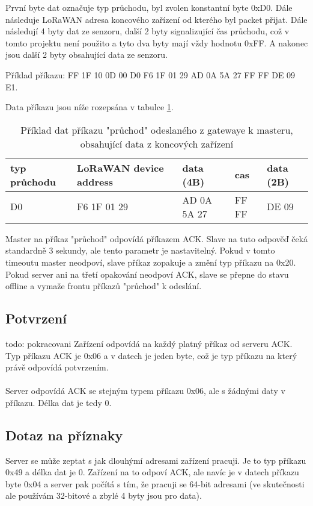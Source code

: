 První byte dat označuje typ průchodu, byl zvolen konstantní byte 0xD0. Dále následuje LoRaWAN adresa koncového zařízení od kterého byl packet přijat. Dále následují 4 byty dat ze senzoru, další 2 byty signalizující čas průchodu, což v tomto projektu není použito a tyto dva byty mají vždy hodnotu 0xFF. A nakonec jsou další 2 byty obsahující data ze senzoru.

Příklad příkazu: FF 1F 10 0D 00 D0 F6 1F 01 29 AD 0A 5A 27 FF FF DE 09 E1.

Data příkazu jsou níže rozepsána v tabulce \ref{table:prikladprikazpruchod}.

\begin{table}[!h]
    \centering
\begin{tabular}{ | p{1.5cm} | p{3cm} | p{2.5cm} | p{1.3cm} | p{1.3cm} |  }
 \hline
 typ průchodu & LoRaWAN device address & data (4B)     & cas   & data (2B) \\ \hline
 D0           & F6 1F 01 29            &  AD 0A 5A 27  & FF FF & DE 09     \\ 
 \hline
\end{tabular}
    \caption{Příklad dat příkazu "průchod" odeslaného z gatewaye k masteru, obsahující data z koncových zařízení}
    \label{table:prikladprikazpruchod}
\end{table}

Master na příkaz "průchod" odpovídá příkazem ACK. Slave na tuto odpověď čeká standardně 3 sekundy, ale tento parametr je nastavitelný. Pokud v tomto timeoutu master neodpoví, slave  příkaz zopakuje a změní typ příkazu na 0x20. Pokud server ani na třetí opakování neodpoví ACK, slave se přepne do stavu offline a vymaže frontu příkazů "průchod" k odeslání.

\subsection{Potvrzení}
todo: pokracovani
Zařízení odpovídá na každý platný příkaz od serveru ACK. Typ příkazu ACK je 0x06 a v datech je jeden byte, což je typ příkazu na který právě odpovídá potvrzením.
\\ \\
Server odpovídá ACK se stejným typem příkazu 0x06, ale s žádnými daty v příkazu. Délka dat je tedy 0.

\subsection{Dotaz na příznaky}
Server se může zeptat s jak dlouhýmí adresami zařízení pracuji. Je to typ příkazu 0x49 a délka dat je 0. Zařízení na to odpoví ACK, ale navíc je v datech příkazu byte 0x04 a server pak počítá s tím, že pracuji se 64-bit adresami (ve skutečnosti ale používám 32-bitové a zbylé 4 byty jsou pro data).


